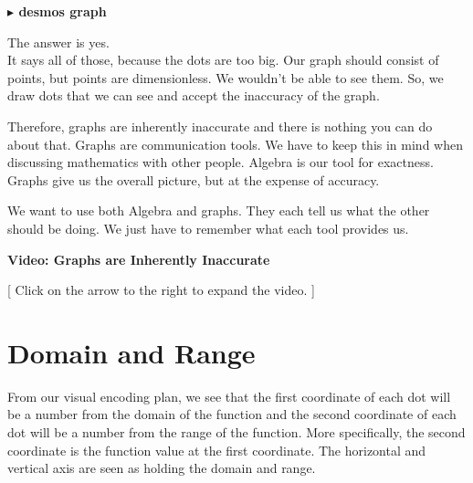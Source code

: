 \documentclass{ximera}
\begin{document}
\textbf{\textcolor{blue!55!black}{$\blacktriangleright$ desmos graph}} 
\begin{center}
\end{center}




The answer is yes.  \\


It says all of those, because the dots are too big.  Our graph should consist of points, but points are dimensionless.  We wouldn't be able to see them.  So, we draw dots that we can see and accept the inaccuracy of the graph.

Therefore, graphs are inherently inaccurate and there is nothing you can do about that.  Graphs are communication tools. We have to keep this in mind when discussing mathematics with other people. Algebra is our tool for exactness.  Graphs give us the overall picture, but at the expense of accuracy.

We want to use both Algebra and graphs.  They each tell us what the other should be doing.  We just have to remember what each tool provides us.






\begin{explanation} \textbf{Video: Graphs are Inherently Inaccurate}

[ Click on the arrow to the right to expand the video. ]
\begin{expandable} 

\begin{center}
\end{center}

\end{expandable}
\end{explanation}














\section*{Domain and Range}


From our visual encoding plan, we see that the first coordinate of each dot will be a number from the domain of the function and the second coordinate of each dot will be a number from the range of the function.  More specifically, the second coordinate is the function value at the first coordinate.  The horizontal and vertical axis are seen as holding the domain and range.
\end{document}
